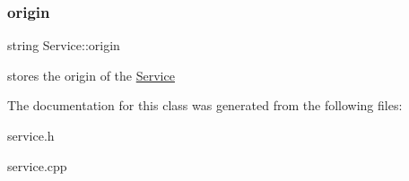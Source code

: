 \subsubsection{\texorpdfstring{origin}{origin}}
{\footnotesize\ttfamily string Service\+::origin\hspace{0.3cm}{\ttfamily [protected]}}

stores the origin of the \hyperlink{class_service}{Service} 

The documentation for this class was generated from the following files\+:\begin{DoxyCompactItemize}
\item 
service.\+h\item 
service.\+cpp\end{DoxyCompactItemize}
